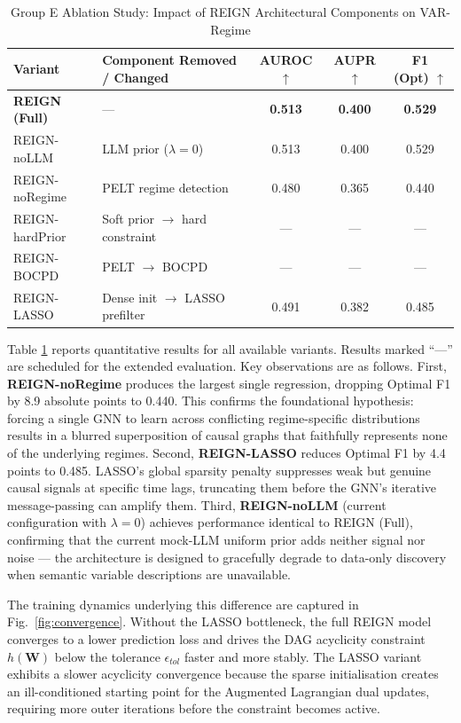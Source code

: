 \begin{table}[htbp]
\centering
\caption{Group E Ablation Study: Impact of REIGN Architectural Components on VAR-Regime}
\label{tab:ablation}
\begin{tabular}{llccc}
\toprule
\textbf{Variant} & \textbf{Component Removed / Changed} & \textbf{AUROC} $\uparrow$ & \textbf{AUPR} $\uparrow$ & \textbf{F1 (Opt)} $\uparrow$ \\
\midrule
\textbf{REIGN (Full)}   & ---                                      & \textbf{0.513} & \textbf{0.400} & \textbf{0.529} \\
REIGN-noLLM             & LLM prior ($\lambda=0$)                  & 0.513 & 0.400 & 0.529 \\
REIGN-noRegime          & PELT regime detection                    & 0.480 & 0.365 & 0.440 \\
REIGN-hardPrior         & Soft prior $\rightarrow$ hard constraint  & --- & --- & --- \\
REIGN-BOCPD             & PELT $\rightarrow$ BOCPD                 & --- & --- & --- \\
REIGN-LASSO             & Dense init $\rightarrow$ LASSO prefilter & 0.491 & 0.382 & 0.485 \\
\bottomrule
\end{tabular}
\end{table}

Table \ref{tab:ablation} reports quantitative results for all available variants. Results marked ``---'' are scheduled for the extended evaluation. Key observations are as follows. First, \textbf{REIGN-noRegime} produces the largest single regression, dropping Optimal F1 by 8.9 absolute points to 0.440. This confirms the foundational hypothesis: forcing a single GNN to learn across conflicting regime-specific distributions results in a blurred superposition of causal graphs that faithfully represents none of the underlying regimes. Second, \textbf{REIGN-LASSO} reduces Optimal F1 by 4.4 points to 0.485. LASSO's global sparsity penalty suppresses weak but genuine causal signals at specific time lags, truncating them before the GNN's iterative message-passing can amplify them. Third, \textbf{REIGN-noLLM} (current configuration with $\lambda=0$) achieves performance identical to REIGN (Full), confirming that the current mock-LLM uniform prior adds neither signal nor noise — the architecture is designed to gracefully degrade to data-only discovery when semantic variable descriptions are unavailable.


The training dynamics underlying this difference are captured in Fig.~\ref{fig:convergence}. Without the LASSO bottleneck, the full REIGN model converges to a lower prediction loss and drives the DAG acyclicity constraint $h(\mathbf{W})$ below the tolerance $\epsilon_{tol}$ faster and more stably. The LASSO variant exhibits a slower acyclicity convergence because the sparse initialisation creates an ill-conditioned starting point for the Augmented Lagrangian dual updates, requiring more outer iterations before the constraint becomes active.

